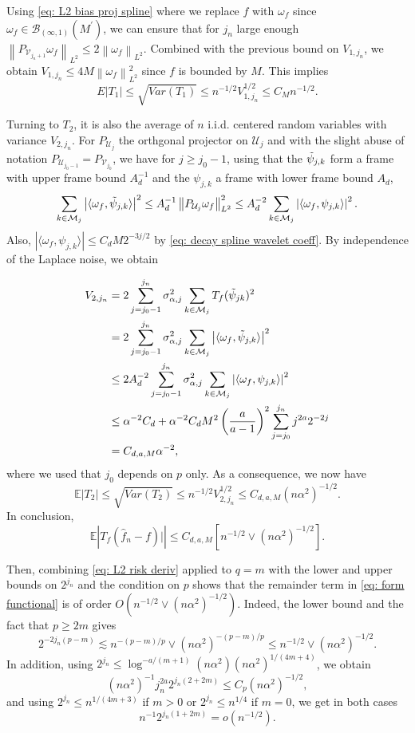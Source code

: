 \documentclass[preprint]{imsart}
\newcommand{\E}{{\mathbb E}}
\newcommand\norm[1]{\left\lVert#1\right\rVert}
\numberwithin{equation}{section}
\newcounter{cond}
\begin{document}
\begin{appendix}
Using \eqref{eq: L2 bias proj spline} where we replace $f$ with $\omega_f$ since $\omega_f\in\mathcal{B}_{(\infty,1)}(M^\prime)$, we can ensure that for $j_n$ large enough $\norm{P_{\mathcal{V}_{j_n+1}}\omega_f}_{L^2}\leq 2\norm{\omega_f}_{L^2}$. Combined with the previous bound on $V_{1,j_n}$, we obtain $V_{1,j_n}\leq 4M\norm{\omega_f}^2_{L^2}$ since $f$ is bounded by $M$. This implies 
\[E|T_1|\leq \sqrt{Var(T_1)} \leq n^{-1/2} V_{1,j_n}^{1/2}\leq C_M n^{-1/2} .\]



Turning to $T_2$, it is also the average of $n$ i.i.d. centered random variables with variance $V_{2,j_n}$. For $P_{\mathcal{U}_j}$ the orthgonal projector on $\mathcal{U}_j$ and with the slight abuse of notation $P_{\mathcal{U}_{j_0-1}} = P_{\mathcal{V}_{j_0}}$, we have for $j\geq j_0-1$, using that the $\Tilde{\psi}_{j,k}$ form a frame with upper frame bound $A_d^{-1}$ and the $\psi_{j,k}$ a frame with lower frame bound $A_d$, 
\[\sum_{k\in\mathcal{M}_{j}} \left|\langle \omega_f, \Tilde{\psi}_{j,k}\rangle\right|^2 \leq A_d^{-1}\norm{P_{\mathcal{U}_j}\omega_f}_{L^2}^2\leq A_d^{-2}\sum_{k\in\mathcal{M}_{j}} \left|\langle \omega_f, \psi_{j,k}\rangle\right|^2. \]Also, $\left|\langle \omega_f, \psi_{j,k}\rangle\right|\leq C_d M 2^{-3j/2}$ by \eqref{eq: decay spline wavelet coeff}.
By independence of the Laplace noise, we obtain

     \begin{align*}
         V_{2,j_n} &=  2\sum_{j=j_0-1}^{j_n} \sigma_{\alpha,j}^2\sum_{k\in\mathcal{M}_{j}} T_f(\Tilde{\psi}_{jk})^2 \\
        &= 2\sum_{j=j_0-1}^{j_n} \sigma_{\alpha,j}^2\sum_{k\in\mathcal{M}_{j}} \left|\langle \omega_f, \Tilde{\psi}_{j,k}\rangle\right|^2\\
        &\leq 2A_d^{-2}\sum_{j=j_0-1}^{j_n} \sigma_{\alpha,j}^2\sum_{k\in\mathcal{M}_{j}} \left|\langle \omega_f, \psi_{j,k}\rangle\right|^2 \\
        &\leq \alpha^{-2}C_d + \alpha^{-2}C_dM^2 \left(\frac{a}{a-1}\right)^2\sum_{j=j_0}^{j_n} j^{2a} 2^{-2j}\\
        &= C_{d,a,M}\alpha^{-2},
     \end{align*}
where we used that $j_0$ depends on $p$ only. As a consequence, we now have
\[\E|T_2|\leq \sqrt{Var(T_2)} \leq n^{-1/2} V_{2,j_n}^{1/2}\leq C_{d,a,M}(n\alpha^2)^{-1/2}.\]
In conclusion,
\[\E\left|T_f(\hat{f}_n-f)|\right|\leq C_{d,a,M}\left[n^{-1/2}\vee(n\alpha^2)^{-1/2}\right].\]

Then, combining \eqref{eq: L2 risk deriv} applied to $q=m$ with the lower and upper bounds on $2^{j_n}$ and the condition on $p$ shows that the remainder term in \eqref{eq: form functional} is of order $O(n^{-1/2}\vee(n\alpha^2)^{-1/2})$. Indeed, the lower bound and the fact that $p\geq 2m$ gives
\[2^{-2j_n(p-m)} \lesssim n^{-(p-m)/p}\vee(n\alpha^2)^{-(p-m)/p} \leq n^{-1/2}\vee(n\alpha^2)^{-1/2}.\]
In addition, using $2^{j_n}\leq \log^{-a/(m+1)}(n\alpha^2)(n\alpha^2)^{1/(4m+4)}$, we obtain
\[(n\alpha^{2})^{-1} j_n^{2a}2^{j_n(2+2m)}\leq C_p (n\alpha^2)^{-1/2},\]
and using $2^{j_n}\leq n^{1/(4m+3)}$ if $m>0$ or $2^{j_n}\leq n^{1/4}$ if $m=0$, we get in both cases
\[n^{-1} 2^{j_n(1+2m)}= o\left(n^{-1/2}\right).\]



\end{appendix}
\end{document}
